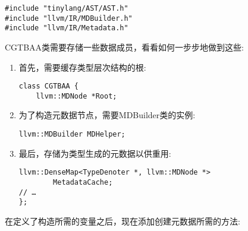 \begin{lstlisting}[caption={}]
#include "tinylang/AST/AST.h"
#include "llvm/IR/MDBuilder.h"
#include "llvm/IR/Metadata.h"
\end{lstlisting}

CGTBAA类需要存储一些数据成员，看看如何一步步地做到这些:\par

\begin{enumerate}
\item 首先，需要缓存类型层次结构的根:
\begin{lstlisting}[caption={}]
class CGTBAA {
	llvm::MDNode *Root;
\end{lstlisting}

\item 为了构造元数据节点，需要MDBuilder类的实例:
\begin{lstlisting}[caption={}]
 	llvm::MDBuilder MDHelper;
\end{lstlisting}

\item 最后，存储为类型生成的元数据以供重用:
\begin{lstlisting}[caption={}]
	llvm::DenseMap<TypeDenoter *, llvm::MDNode *> 
		MetadataCache;
// …
};
\end{lstlisting}
\end{enumerate}

在定义了构造所需的变量之后，现在添加创建元数据所需的方法:\par


